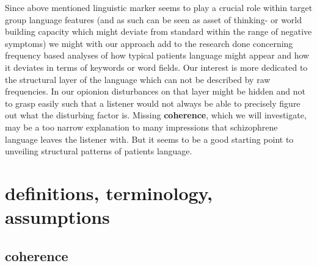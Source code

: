 \documentclass[
  12pt,
  oneside]{book}
\begin{document}
Since above mentioned linguistic marker seems to play a crucial role within target group language features (and as such can be seen as asset of thinking- or world building capacity which might deviate from standard within the range of negative symptoms) we might with our approach add to the research done concerning frequency based analyses of how typical patients language might appear and how it deviates in terms of keywords or word fields. Our interest is more dedicated to the structural layer of the language which can not be described by raw frequencies. In our opionion disturbances on that layer might be hidden and not to grasp easily such that a listener would not always be able to precisely figure out what the disturbing factor is. Missing \textbf{coherence}, which we will investigate, may be a too narrow explanation to many impressions that schizophrene language leaves the listener with. But it seems to be a good starting point to unveiling structural patterns of patients language.

\section{definitions, terminology, assumptions}\label{definitions-terminology-assumptions}

\subsection{coherence}\label{coherence}
\end{document}
